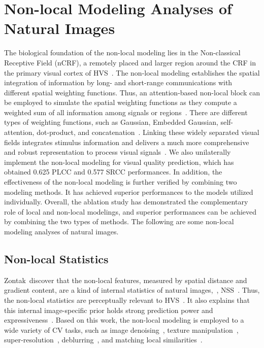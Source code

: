 \section{Non-local Modeling Analyses of Natural Images}\label{Non-local Modeling Analyses for Natural Images}
	The biological foundation of the non-local modeling lies in the Non-classical Receptive Field (nCRF), a remotely placed and larger region around the CRF in the primary visual cortex of HVS~\citep{polat1996neurophysiological, zenger1996isolating}. The non-local modeling establishes the spatial integration of information by long- and short-range communications with different spatial weighting functions. Thus, an attention-based non-local block can be employed to simulate the spatial weighting functions as they compute a weighted sum of all information among signals or regions~\citep{wang2018non, buades2011non, vaswani2017attention}. There are different types of weighting functions, such as Gaussian, Embedded Gaussian, self-attention, dot-product, and concatenation~\citep{wang2018non}. Linking these widely separated visual fields integrates stimulus information and delivers a much more comprehensive and robust representation to process visual signals~\citep{polat1996neurophysiological}. We also unilaterally implement the non-local modeling for visual quality prediction, which has obtained 0.625 PLCC and 0.577 SRCC performances. In addition, the effectiveness of the non-local modeling is further verified by combining two modeling methods. It has achieved superior performances to the models utilized individually. Overall, the ablation study has demonstrated the complementary role of local and non-local modelings, and superior performances can be achieved by combining the two types of methods. The following are some non-local modeling analyses of natural images.
	
	\subsection{Non-local Statistics}\label{Non-local Statistics}
	Zontak~\etal discover that the non-local features, measured by spatial distance and gradient content, are a kind of internal statistics of natural images,~\ie, NSS~\citep{zontak2011internal, irani2019blind, zontak2018internal, zhu2003statistical}. Thus, the non-local statistics are perceptually relevant to HVS~\citep{irani2019blind}. It also explains that this internal image-specific prior holds strong prediction power and expressiveness~\citep{zontak2011internal, irani2019blind, zontak2018internal, zhang2010non}. Based on this work, the non-local modeling is employed to a wide variety of CV tasks, such as image denoising~\citep{buades2011non, mosseri2013combining, zontak2013separating}, texture manipulation~\citep{dekel2015revealing}, super-resolution~\citep{wang2015learning, freedman2011image, zuckerman2020across, cheng2020zero}, deblurring~\citep{michaeli2014blind}, and matching local similarities~\citep{shechtman2007matching}. 
	
